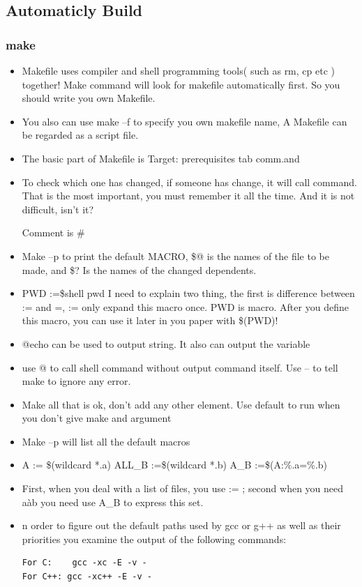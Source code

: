 \documentclass[a4paper,12pt,twoside]{book}
\begin{document}
\subsection{Automaticly Build}
\subsubsection{make}

	\begin{itemize}
		\item Makefile uses compiler and shell programming tools( such as rm, cp etc ) together!
		Make command will look for makefile automatically first. So you should write you own Makefile.
		\item You also can use make –f to specify you own makefile name,
		A Makefile can be regarded as a script file.

		\item The basic part of Makefile is Target: prerequisites
                        tab comm.and
		\item To check which one has changed, if someone has change, it will call command.
That is the most important, you must remember it all the time.  And it is not difficult, isn't it?

		Comment is \#
		\item Make –p to print the default MACRO, \$@ is the names of the file to be made, and \$? Is the names of
the changed dependents.

		\item PWD :=\${shell pwd} I need to explain two thing, the first is difference between := and =, := only
expand this macro once.    PWD is macro. After you define this macro, you can use it later in you paper with
\$(PWD)!

		\item @echo can be used to output string. It also can output the variable
		\item use @ to call shell command without output command itself. Use – to tell make to ignore any error.
		\item Make all that is ok, don’t add any other element. Use default to run when you don’t give make and argument
		\item Make –p will list all the default macros
		\item A := \$(wildcard *.a)  ALL\_B :=\$(wildcard *.b)  A\_B :=\$(A:\%.a=\%.b)
		\item First, when you deal with a list of files, you use := ; second when you need aàb you need use A\_B to express this set.
		\item n order to figure out the default paths used by gcc or g++ as well as their priorities you examine the output of the following commands:
\begin{verbatim}
For C:    gcc -xc -E -v -
For C++: gcc -xc++ -E -v -
\end{verbatim}

\end{itemize}
\end{document}
